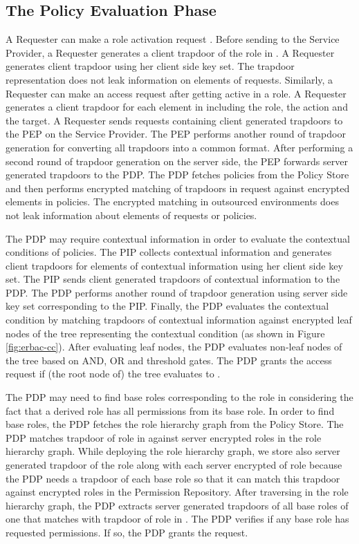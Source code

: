 \documentclass[epsfig,a4paper,11pt,titlepage]{book}
\numberwithin{algorithm}{chapter}
\begin{document}
\subsection{The Policy Evaluation Phase}
A Requester can make a role activation request . Before sending  to the Service Provider, a Requester generates a client trapdoor of the role in . A Requester generates client trapdoor using her client side key set. The trapdoor representation does not leak information on elements of requests. Similarly, a Requester can make an access request  after getting active in a role. A Requester generates a client trapdoor for each element in  including the role, the action and the target. A Requester sends requests containing client generated trapdoors to the \gls{PEP} on the Service Provider. The \gls{PEP} performs another round of trapdoor generation for converting all trapdoors into a common format. After performing a second round of trapdoor generation on the server side, the \gls{PEP} forwards server generated trapdoors to the \gls{PDP}. The \gls{PDP} fetches policies from the Policy Store and then performs encrypted matching of trapdoors in request against encrypted elements in policies. The encrypted matching in outsourced environments does not leak information about elements of requests or policies. 

The \gls{PDP} may require contextual information in order to evaluate the contextual conditions of policies. The \gls{PIP} collects contextual information and generates client trapdoors for elements of contextual information using her client side key set. The \gls{PIP} sends client generated trapdoors of contextual information to the \gls{PDP}. The \gls{PDP} performs another round of trapdoor generation using server side key set corresponding to the \gls{PIP}. Finally, the \gls{PDP} evaluates the contextual condition by matching trapdoors of contextual information against encrypted leaf nodes of the tree representing the contextual condition (as shown in Figure \ref{fig:erbac-cc}). After evaluating leaf nodes, the \gls{PDP} evaluates non-leaf nodes of the tree based on AND, OR and threshold gates. The \gls{PDP} grants the access request if (the root node of) the tree evaluates to .

The \gls{PDP} may need to find base roles corresponding to the role in  considering the fact that a derived role has all permissions from its base role. In order to find base roles, the \gls{PDP} fetches the role hierarchy graph from the Policy Store. The \gls{PDP} matches trapdoor of role in  against server encrypted roles in the role hierarchy graph. While deploying the role hierarchy graph, we store also server generated trapdoor of the role along with each server encrypted of role because the \gls{PDP} needs a trapdoor of each base role so that it can match this trapdoor against encrypted roles in the Permission Repository. After traversing in the role hierarchy graph, the \gls{PDP} extracts server generated trapdoors of all base roles of one that matches with trapdoor of role in . The \gls{PDP} verifies if any base role has requested permissions. If so, the \gls{PDP} grants the request.
\end{document}
